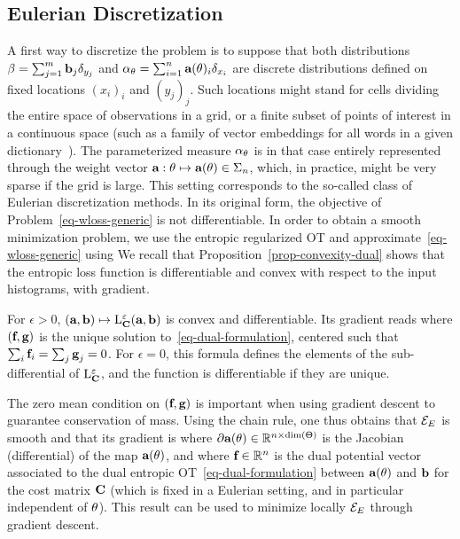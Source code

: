 \subsection{Eulerian Discretization}

A first way to discretize the problem is to suppose that both distributions $\beta=\sum_{j=1}^m \mathrm{\textbf{b}}_j \delta_{y_j}$ and $\alpha_\theta=\sum_{i=1}^n \mathrm{\textbf{a}}(\theta)_i \delta_{x_i}$ are discrete distributions defined on fixed locations $(x_i)_i$ and $(y_j)_j$. Such locations might stand for cells dividing the entire space of observations in a grid, or a finite subset of points of interest in a continuous space (such as a family of vector embeddings for all words in a given dictionary~\citep{kusner2015word,pmlr-v51-rolet16}). The parameterized measure $\alpha_\theta$ is in that case entirely represented through the weight vector $\mathrm{\textbf{a}} : \theta \mapsto \mathrm{\textbf{a}}(\theta) \in \Sigma_n$, which, in practice, might be very sparse if the grid is large. This setting corresponds to the so-called class of Eulerian discretization methods. In its original form, the objective of Problem~\eqref{eq-wloss-generic} is not differentiable. In order to obtain a smooth minimization problem, we use the entropic regularized OT and approximate~\eqref{eq-wloss-generic} using 
We recall that Proposition~\ref{prop-convexity-dual} shows that the entropic loss function is differentiable and convex with respect to the input histograms, with gradient.

\begin{proposition}
For $\epsilon>0$, 
$(\mathrm{\textbf{a}},\mathrm{\textbf{b}}) \mapsto \mathrm{L}_{\mathrm{\textbf{C}}}^\varepsilon(\mathrm{\textbf{a}},\mathrm{\textbf{b}})$ is convex and differentiable. Its gradient reads
\eql{\label{eq-diff-marginals}
		\nabla \MKD_\C^\epsilon(\a,\b) = (\fD,\gD),
}
where $(\mathrm{\textbf{f}},\mathrm{\textbf{g}})$ is the unique solution to~\eqref{eq-dual-formulation}, centered such that $\sum_i \mathrm{\textbf{f}}_i=\sum_j \mathrm{\textbf{g}}_j=0$. For $\epsilon=0$, this formula defines the elements of the sub-differential of $\mathrm{L}_{\mathrm{\textbf{C}}}^\varepsilon$, and the function is differentiable if they are unique. 
\end{proposition}

The zero mean condition on $(\mathrm{\textbf{f}},\mathrm{\textbf{g}})$ is important when using gradient descent to guarantee conservation of mass.
%
Using the chain rule, one thus obtains that $\mathcal{E}_E$ is smooth and that its gradient is
where $\partial \mathrm{\textbf{a}}(\theta) \in \mathbb{R}^{n \times \text{dim}(\Theta)}$ is the Jacobian (differential) of the map $\mathrm{\textbf{a}}(\theta)$, and 
where $\mathrm{\textbf{f}} \in \mathbb{R}^n$ is the dual potential vector associated to the dual entropic OT~\eqref{eq-dual-formulation} between $\mathrm{\textbf{a}}(\theta)$ and $\mathrm{\textbf{b}}$ for the cost matrix $\mathrm{\textbf{C}}$ (which is fixed in a Eulerian setting, and in particular independent of $\theta$). 
%
This result can be used to minimize locally $\mathcal{E}_E$ through gradient descent.

